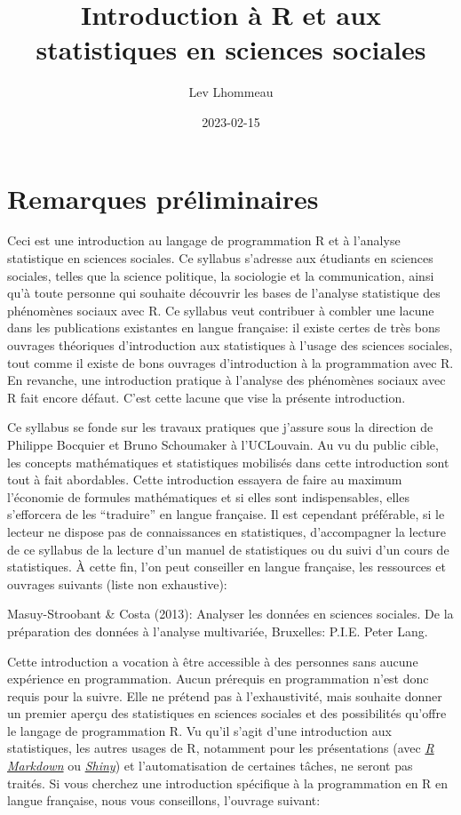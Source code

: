 \documentclass[
]{book}
\title{Introduction à R et aux statistiques en sciences sociales}
\author{Lev Lhommeau}
\date{2023-02-15}
\begin{document}
\maketitle

{
\setcounter{tocdepth}{1}
\tableofcontents
}
\hypertarget{remarques-pruxe9liminaires}{%
\chapter{Remarques préliminaires}\label{remarques-pruxe9liminaires}}

Ceci est une introduction au langage de programmation R et à l'analyse statistique en sciences sociales. Ce syllabus s'adresse aux étudiants en sciences sociales, telles que la science politique, la sociologie et la communication, ainsi qu'à toute personne qui souhaite découvrir les bases de l'analyse statistique des phénomènes sociaux avec R. Ce syllabus veut contribuer à combler une lacune dans les publications existantes en langue française: il existe certes de très bons ouvrages théoriques d'introduction aux statistiques à l'usage des sciences sociales, tout comme il existe de bons ouvrages d'introduction à la programmation avec R. En revanche, une introduction pratique à l'analyse des phénomènes sociaux avec R fait encore défaut. C'est cette lacune que vise la présente introduction.

Ce syllabus se fonde sur les travaux pratiques que j'assure sous la direction de Philippe Bocquier et Bruno Schoumaker à l'UCLouvain. Au vu du public cible, les concepts mathématiques et statistiques mobilisés dans cette introduction sont tout à fait abordables. Cette introduction essayera de faire au maximum l'économie de formules mathématiques et si elles sont indispensables, elles s'efforcera de les ``traduire'' en langue française. Il est cependant préférable, si le lecteur ne dispose pas de connaissances en statistiques, d'accompagner la lecture de ce syllabus de la lecture d'un manuel de statistiques ou du suivi d'un cours de statistiques. À cette fin, l'on peut conseiller en langue française, les ressources et ouvrages suivants (liste non exhaustive):

Masuy-Stroobant \& Costa (2013): Analyser les données en sciences sociales. De la préparation des données à l'analyse multivariée, Bruxelles: P.I.E. Peter Lang.

Cette introduction a vocation à être accessible à des personnes sans aucune expérience en programmation. Aucun prérequis en programmation n'est donc requis pour la suivre. Elle ne prétend pas à l'exhaustivité, mais souhaite donner un premier aperçu des statistiques en sciences sociales et des possibilités qu'offre le langage de programmation R. Vu qu'il s'agit d'une introduction aux statistiques, les autres usages de R, notamment pour les présentations (avec \href{https://rmarkdown.rstudio.com/}{\emph{R Markdown}} ou \href{https://shiny.rstudio.com/}{\emph{Shiny}}) et l'automatisation de certaines tâches, ne seront pas traités. Si vous cherchez une introduction spécifique à la programmation en R en langue française, nous vous conseillons, l'ouvrage suivant:
\end{document}
